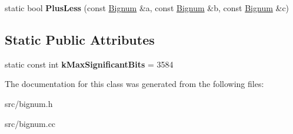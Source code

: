 \begin{DoxyCompactItemize}
\item 
\hypertarget{classv8_1_1internal_1_1_bignum_afe71a5ec7c5f2cfdd617941b5a3942f6}{}static bool {\bfseries Plus\+Less} (const \hyperlink{classv8_1_1internal_1_1_bignum}{Bignum} \&a, const \hyperlink{classv8_1_1internal_1_1_bignum}{Bignum} \&b, const \hyperlink{classv8_1_1internal_1_1_bignum}{Bignum} \&c)\label{classv8_1_1internal_1_1_bignum_afe71a5ec7c5f2cfdd617941b5a3942f6}

\end{DoxyCompactItemize}
\subsection*{Static Public Attributes}
\begin{DoxyCompactItemize}
\item 
\hypertarget{classv8_1_1internal_1_1_bignum_a39b4483fcc51510126697c3111aae021}{}static const int {\bfseries k\+Max\+Significant\+Bits} = 3584\label{classv8_1_1internal_1_1_bignum_a39b4483fcc51510126697c3111aae021}

\end{DoxyCompactItemize}


The documentation for this class was generated from the following files\+:\begin{DoxyCompactItemize}
\item 
src/bignum.\+h\item 
src/bignum.\+cc\end{DoxyCompactItemize}
